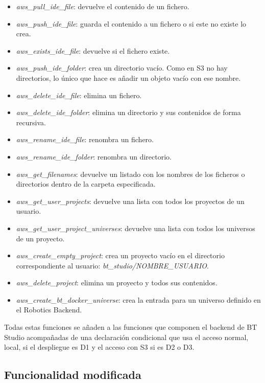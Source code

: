 \begin{itemize}
    \item \textit{aws\_pull\_ide\_file}: devuelve el contenido de un fichero.
    \item \textit{aws\_push\_ide\_file}: guarda el contenido a un fichero o si este no existe lo crea.
    \item \textit{aws\_exists\_ide\_file}: devuelve si el fichero existe.
    \item \textit{aws\_push\_ide\_folder}: crea un directorio vacío. Como en S3 no hay directorios, lo único que hace es añadir un objeto vacío con ese nombre.
    \item \textit{aws\_delete\_ide\_file}: elimina un fichero.
    \item \textit{aws\_delete\_ide\_folder}: elimina un directorio y sus contenidos de forma recursiva.
    \item \textit{aws\_rename\_ide\_file}: renombra un fichero.
    \item \textit{aws\_rename\_ide\_folder}: renombra un directorio.
    \item \textit{aws\_get\_filenames}: devuelve un listado con los nombres de los ficheros o directorios dentro de la carpeta especificada.
    \item \textit{aws\_get\_user\_projects}: devuelve una lista con todos los proyectos de un usuario.
    \item \textit{aws\_get\_user\_project\_universes}: devuelve una lista con todos los universos de un proyecto.
    \item \textit{aws\_create\_empty\_project}: crea un proyecto vacío en el directorio correspondiente al usuario: \textit{bt\_studio/NOMBRE\_USUARIO}.
    \item \textit{aws\_delete\_project}: elimina un proyecto y todos sus contenidos.
    \item \textit{aws\_create\_bt\_docker\_universe}: crea la entrada para un universo definido en el Robotics Backend.
\end{itemize}

Todas estas funciones se añaden a las funciones que componen el backend de BT Studio acompañadas de una declaración condicional que usa el acceso normal, local, si el despliegue es D1 y el acceso con S3 si es D2 o D3.

\subsection{Funcionalidad modificada}

